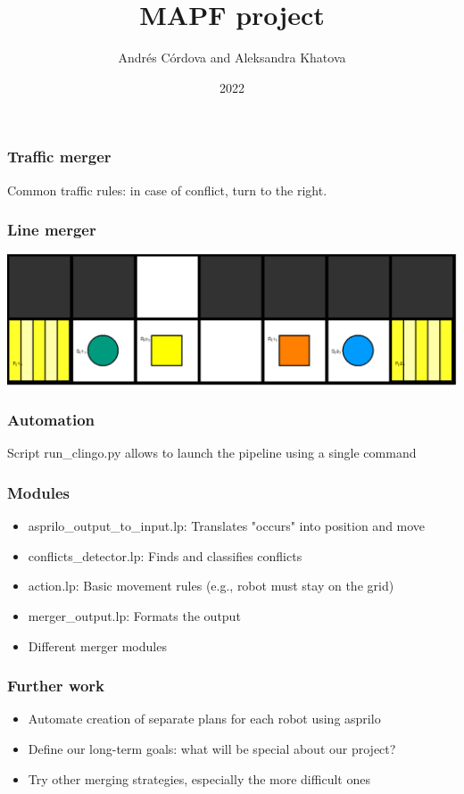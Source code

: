\documentclass{beamer}
\title{MAPF project}
\author{Andrés Córdova and Aleksandra Khatova}
\institute{Unversity of Potsdam}
\date{2022}
\begin{document}
\frame{\titlepage}

\begin{frame}
\frametitle{Traffic merger}
Common traffic rules: in case of conflict, turn to the right.
\end{frame}


\begin{frame}
\frametitle{Line merger}
\centering
\includegraphics[scale=0.2]{x5y2r2s2p2.png}
\end{frame}

\begin{frame}
\frametitle{Automation}
Script run\_clingo.py allows to launch the pipeline using a single command
\end{frame}

\begin{frame}
\frametitle{Modules}
\begin{itemize}
\item<1->asprilo\_output\_to\_input.lp: Translates "occurs" into position and move
\item<2->conflicts\_detector.lp: Finds and classifies conflicts
\item<3->action.lp: Basic movement rules (e.g., robot must stay on the grid)
\item<4->merger\_output.lp: Formats the output
\item<4->Different merger modules
\end{itemize}
\end{frame}


\begin{frame}
\frametitle{Further work}
\begin{itemize} 
\item<1-> Automate creation of separate plans for each robot using asprilo
\item<2-> Define our long-term goals: what will be special about our project?
\item<3-> Try other merging strategies, especially the more difficult ones
\end{itemize} 
\end{frame}
\end{document}
